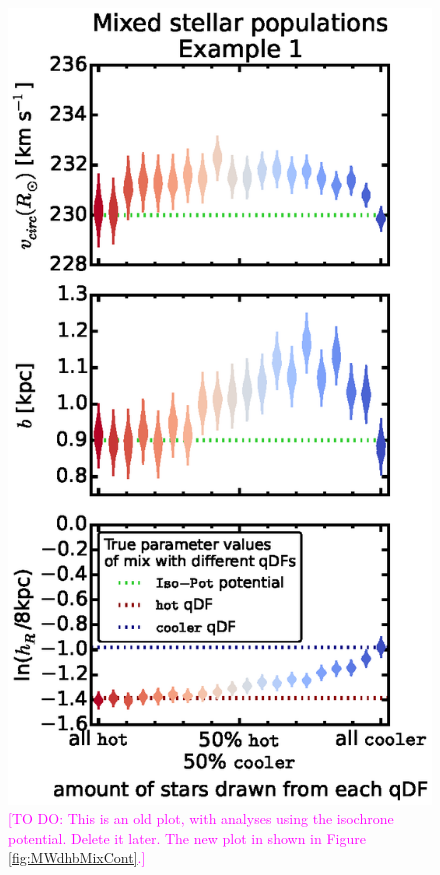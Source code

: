 \documentclass[iop,revtex4,numberedappendix,appendixfloats]{emulateapj}
\newcommand{\Wilma}[1]{\textcolor{Magenta}{#1}}
\begin{document}
\begin{figure}[!htbp]
\centering
\begin{minipage}{0.48\textwidth}
\centering
\includegraphics[scale=0.55]{figs/isoSphFlexMixCont_violins_2.eps}
\caption{\Wilma{[TO DO: This is an old plot, with analyses using the isochrone potential. Delete it later. The new plot in shown in Figure \ref{fig:MWdhbMixCont}.]}}

\end{minipage}
\end{figure}
\end{document}
